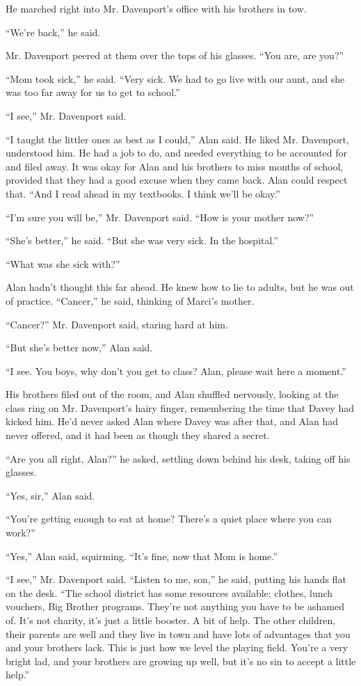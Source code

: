 He marched right into Mr.  Davenport's office with his brothers in
tow.

``We're back,'' he said.

Mr.  Davenport peered at them over the tops of his glasses.  ``You
are, are you?''

``Mom took sick,'' he said.  ``Very sick.  We had to go live with our
aunt, and she was too far away for us to get to school.''

``I see,'' Mr.  Davenport said.

``I taught the littler ones as best as I could,'' Alan said.  He liked
Mr.  Davenport, understood him.  He had a job to do, and needed
everything to be accounted for and filed away.  It was okay for Alan
and his brothers to miss months of school, provided that they had a
good excuse when they came back.  Alan could respect that.  ``And I
read ahead in my textbooks.  I think we'll be okay.''

``I'm sure you will be,'' Mr.  Davenport said.  ``How is your mother
now?''

``She's better,'' he said.  ``But she was very sick.  In the
hospital.''

``What was she sick with?''

Alan hadn't thought this far ahead.  He knew how to lie to adults, but
he was out of practice.  ``Cancer,'' he said, thinking of Marci's
mother.

``Cancer?'' Mr.  Davenport said, staring hard at him.

``But she's better now,'' Alan said.

``I see.  You boys, why don't you get to class?  Alan, please wait
here a moment.''

His brothers filed out of the room,  and Alan shuffled nervously,
looking at the class ring on Mr.  Davenport's hairy finger,
remembering the time that Davey had kicked him.  He'd never asked Alan
where Davey was after that, and Alan had never offered, and it had
been as though they shared a secret.

``Are you all right, Alan?'' he asked, settling down behind his desk,
taking off his glasses.

``Yes, sir,'' Alan said.

``You're getting enough to eat at home?  There's a quiet place where
you can work?''

``Yes,'' Alan said, squirming.  ``It's fine, now that Mom is home.''

``I see,'' Mr.  Davenport said.  ``Listen to me, son,'' he said,
putting his hands flat on the desk.  ``The school district has some
resources available:  clothes, lunch vouchers, Big Brother programs. 
They're not anything you have to be ashamed of.  It's not charity,
it's just a little booster.  A bit of help.  The other children, their
parents are well and they live in town and have lots of advantages
that you and your brothers lack.  This is just how we level the
playing field.  You're a very bright lad, and your brothers are
growing up well, but it's no sin to accept a little help.''

